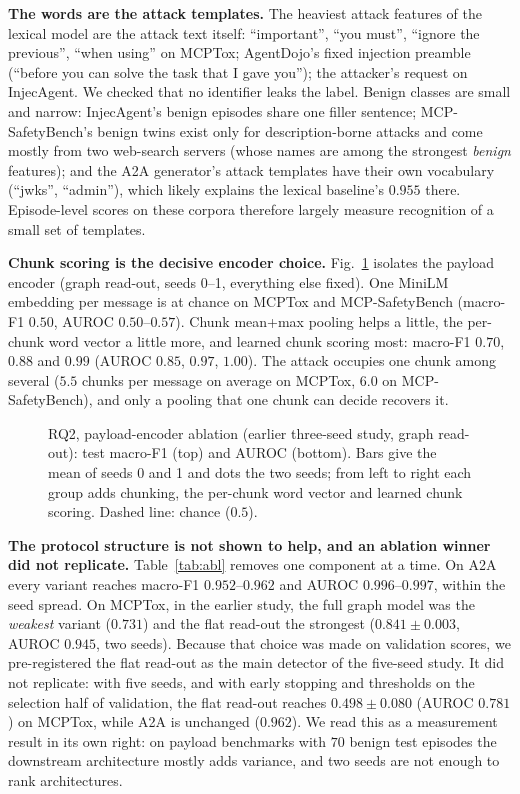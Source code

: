 \documentclass[conference,compsoc]{IEEEtran}
\begin{document}
\textbf{The words are the attack templates.} The heaviest attack features of the lexical model are the attack text itself: ``important'', ``you must'', ``ignore the previous'', ``when using'' on MCPTox; AgentDojo's fixed injection preamble (``before you can solve the task that I gave you''); the attacker's request on InjecAgent. We checked that no identifier leaks the label. Benign classes are small and narrow: InjecAgent's benign episodes share one filler sentence; MCP-SafetyBench's benign twins exist only for description-borne attacks and come mostly from two web-search servers (whose names are among the strongest \emph{benign} features); and the A2A generator's attack templates have their own vocabulary (``jwks'', ``admin''), which likely explains the lexical baseline's $0.955$ there. Episode-level scores on these corpora therefore largely measure recognition of a small set of templates.

\textbf{Chunk scoring is the decisive encoder choice.} Fig.~\ref{fig:enc} isolates the payload encoder (graph read-out, seeds 0--1, everything else fixed). One MiniLM embedding per message is at chance on MCPTox and MCP-SafetyBench (macro-F1 $0.50$, AUROC $0.50$--$0.57$). Chunk mean+max pooling helps a little, the per-chunk word vector a little more, and learned chunk scoring most: macro-F1 $0.70$, $0.88$ and $0.99$ (AUROC $0.85$, $0.97$, $1.00$). The attack occupies one chunk among several ($5.5$ chunks per message on average on MCPTox, $6.0$ on MCP-SafetyBench), and only a pooling that one chunk can decide recovers it.

\begin{figure}[!t]
\centering

\caption{RQ2, payload-encoder ablation (earlier three-seed study, graph read-out): test macro-F1 (top) and AUROC (bottom). Bars give the mean of seeds 0 and 1 and dots the two seeds; from left to right each group adds chunking, the per-chunk word vector and learned chunk scoring. Dashed line: chance ($0.5$).}
\label{fig:enc}
\end{figure}

\textbf{The protocol structure is not shown to help, and an ablation winner did not replicate.} Table~\ref{tab:abl} removes one component at a time. On A2A every variant reaches macro-F1 $0.952$--$0.962$ and AUROC $0.996$--$0.997$, within the seed spread. On MCPTox, in the earlier study, the full graph model was the \emph{weakest} variant ($0.731$) and the flat read-out the strongest ($0.841\pm0.003$, AUROC $0.945$, two seeds). Because that choice was made on validation scores, we pre-registered the flat read-out as the main detector of the five-seed study. It did not replicate: with five seeds, and with early stopping and thresholds on the selection half of validation, the flat read-out reaches $0.498\pm0.080$ (AUROC $0.781$) on MCPTox, while A2A is unchanged ($0.962$). We read this as a measurement result in its own right: on payload benchmarks with $70$ benign test episodes the downstream architecture mostly adds variance, and two seeds are not enough to rank architectures.
\end{document}
